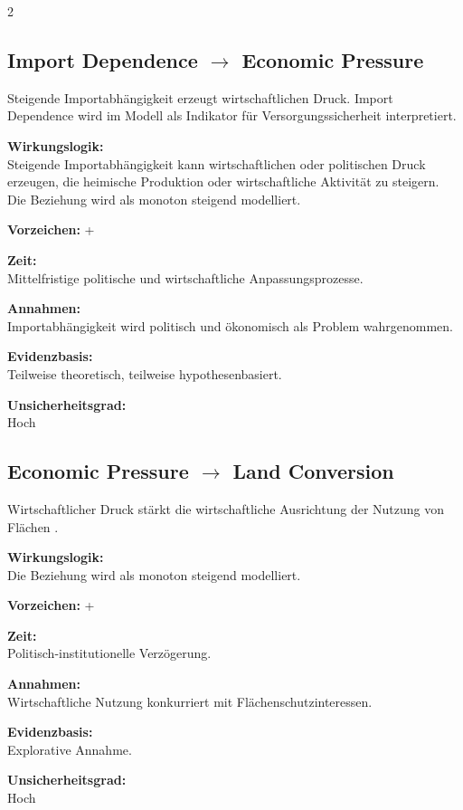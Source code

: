 \documentclass[10pt, a4paper]{article}
\begin{document}
\begin{multicols}{2}

\subsection*{Import Dependence $\rightarrow$ Economic Pressure}
Steigende Importabhängigkeit erzeugt wirtschaftlichen Druck. Import Dependence wird im Modell als Indikator für Versorgungssicherheit interpretiert.

\textbf{Wirkungslogik:}\\
Steigende Importabhängigkeit kann wirtschaftlichen oder politischen Druck erzeugen, die heimische Produktion oder wirtschaftliche Aktivität zu steigern.\\
Die Beziehung wird als monoton steigend modelliert.

\textbf{Vorzeichen:} +

\textbf{Zeit:}\\
Mittelfristige politische und wirtschaftliche Anpassungsprozesse.

\textbf{Annahmen:}\\
Importabhängigkeit wird politisch und ökonomisch als Problem wahrgenommen.

\textbf{Evidenzbasis:}\\
Teilweise theoretisch, teilweise hypothesenbasiert.

\textbf{Unsicherheitsgrad:}\\
Hoch

\vfill\columnbreak

\subsection*{Economic Pressure $\rightarrow$ Land Conversion}
Wirtschaftlicher Druck stärkt die wirtschaftliche Ausrichtung der Nutzung von Flächen .

\textbf{Wirkungslogik:}\\
Die Beziehung wird als monoton steigend modelliert.

\textbf{Vorzeichen:} +

\textbf{Zeit:}\\
Politisch-institutionelle Verzögerung.

\textbf{Annahmen:}\\
Wirtschaftliche Nutzung konkurriert mit Flächenschutzinteressen.

\textbf{Evidenzbasis:}\\
Explorative Annahme.

\textbf{Unsicherheitsgrad:}\\
Hoch

\end{multicols}
\newpage
\end{document}
